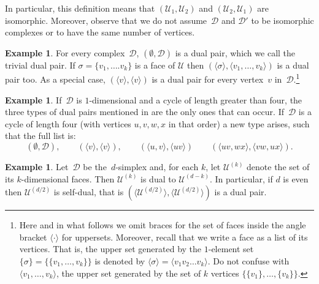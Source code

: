 \documentclass[a4paper,12pt]{amsart}
\theoremstyle{plain}
\theoremstyle{definition}
\newtheorem{example}[theorem]{Example}
\newcommand{\U}{\mathcal U}
\newcommand{\D}{\mathcal D}
\newcommand{\face}{\sigma}
\begin{document}
In particular, this definition means that $(\U_1,\U_2)$ and $(\U_2,\U_1)$ are isomorphic.
Moreover, observe that we do not assume~$\D$ and $\D'$ to be isomorphic complexes or to have the same number of vertices.

\begin{example}
  \label{ex:dual0}
  For every complex~$\D$,  $(\emptyset, \D)$ is a dual pair, which we call the trivial dual pair. If $\face=\{v_1,\dots.v_k\}$ is a face of $\U$ then $(\langle\face\rangle,\langle v_1,\dots , v_k \rangle)$ is a dual pair too. As a special case,  $(\langle v\rangle, \langle v\rangle)$ is a  dual pair for every vertex~$v$ in~$\D$.\footnote{Here and in what follows we omit braces for the set of faces inside the angle bracket $\langle \cdot \rangle$ for uppersets. Moreover, recall that we write a face as a list of its vertices. That is, the upper set generated by the $1$-element set $\{\face\}=\{\{v_1,\dots,v_k\}\}$ is denoted by $\langle \face\rangle = \langle v_1v_2\dots v_k\rangle$. Do not confuse with $\langle v_1,\dots , v_k \rangle$, the upper set generated by the set of $k$ vertices $\{ \{v_1\}, \dots, \{v_k\}\}$.}
\end{example}

\begin{example}
  \label{ex:dual1}
  If~$\D$ is $1$-dimensional and a cycle of length greater than four, the three types of dual pairs mentioned in  are the only ones that can occur. If~$\D$ is a cycle of length four (with vertices $u,v,w,x$ in that order) a new type arises, such that the full list is:
  \[
    (\emptyset, \D),\qquad (\langle v\rangle, \langle v\rangle), \qquad
    (\langle u,v\rangle, \langle uv\rangle) \qquad (\langle uv,wx\rangle,\langle vw,ux\rangle).
  \]
\end{example}

\begin{example}
  \label{ex:dual2}
  Let~$\D$ be the~$d$-simplex and, for each $k$, let $\U^{(k)}$ denote the set of its $k$-dimensional faces. Then $\U^{(k)}$ is dual to $\U^{(d-k)}$. In particular, if $d$ is even then $\U^{(d/2)}$ is self-dual, that is $(\langle \U^{(d/2)} \rangle , \langle \U^{(d/2)} \rangle)$ is a dual pair.
\end{example}
\end{document}
